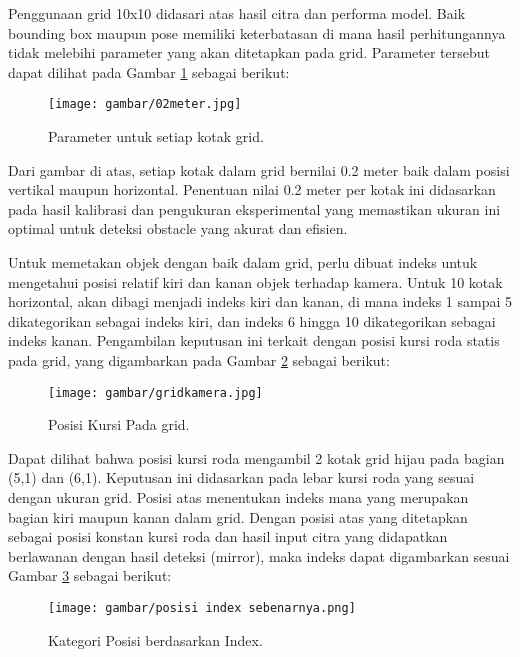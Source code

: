 Penggunaan grid 10x10 didasari atas hasil citra dan performa model. Baik bounding box maupun pose memiliki keterbatasan di mana hasil perhitungannya tidak melebihi parameter yang akan ditetapkan pada grid. Parameter tersebut dapat dilihat pada Gambar \ref{fig:Parameter grid} sebagai berikut:

\begin{figure}[H]
  \centering
  \texttt{[image: gambar/02meter.jpg]}
  \caption{Parameter untuk setiap kotak grid.}
  \label{fig:Parameter grid}
\end{figure}

Dari gambar di atas, setiap kotak dalam grid bernilai 0.2 meter baik dalam posisi vertikal maupun horizontal. Penentuan nilai 0.2 meter per kotak ini didasarkan pada hasil kalibrasi dan pengukuran eksperimental yang memastikan ukuran ini optimal untuk deteksi obstacle yang akurat dan efisien.

Untuk memetakan objek dengan baik dalam grid, perlu dibuat indeks untuk mengetahui posisi relatif kiri dan kanan objek terhadap kamera. Untuk 10 kotak horizontal, akan dibagi menjadi indeks kiri dan kanan, di mana indeks 1 sampai 5 dikategorikan sebagai indeks kiri, dan indeks 6 hingga 10 dikategorikan sebagai indeks kanan. Pengambilan keputusan ini terkait dengan posisi kursi roda statis pada grid, yang digambarkan pada Gambar \ref{fig:Posisi Kursi Pada Grid.} sebagai berikut:

\begin{figure}[H]
  \centering
  \texttt{[image: gambar/gridkamera.jpg]}
  \caption{Posisi Kursi Pada grid.}
  \label{fig:Posisi Kursi Pada Grid.}
\end{figure}

Dapat dilihat bahwa posisi kursi roda mengambil 2 kotak grid hijau pada bagian (5,1) dan (6,1). Keputusan ini didasarkan pada lebar kursi roda yang sesuai dengan ukuran grid. Posisi atas menentukan indeks mana yang merupakan bagian kiri maupun kanan dalam grid. Dengan posisi atas yang ditetapkan sebagai posisi konstan kursi roda dan hasil input citra yang didapatkan berlawanan dengan hasil deteksi (mirror), maka indeks dapat digambarkan sesuai Gambar \ref{fig:Kategori Posisi berdasarkan index.}  sebagai berikut:

\begin{figure}[H]
  \centering
  \texttt{[image: gambar/posisi index sebenarnya.png]}
  \caption{Kategori Posisi berdasarkan Index.}
  \label{fig:Kategori Posisi berdasarkan index.}
\end{figure}

